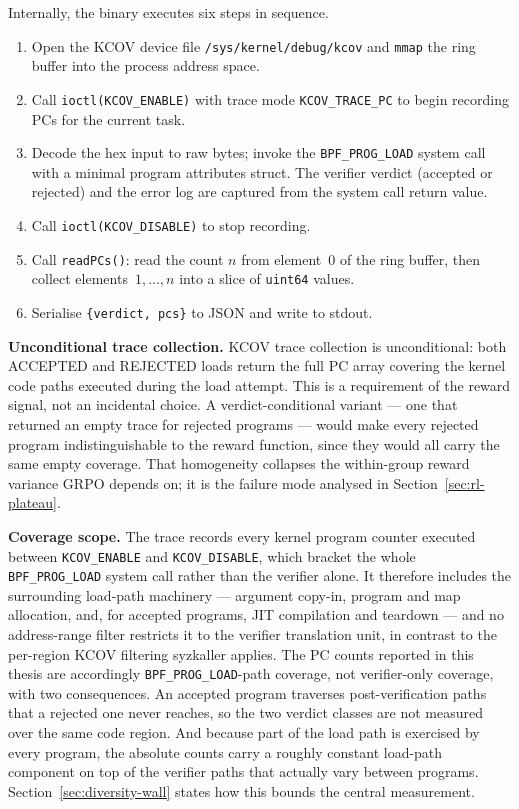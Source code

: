 Internally, the binary executes six steps in sequence.
\begin{enumerate}
  \item Open the KCOV device file \texttt{/sys/kernel/debug/kcov} and
        \texttt{mmap} the ring buffer into the process address space.
  \item Call \texttt{ioctl(KCOV\_ENABLE)} with trace mode
        \texttt{KCOV\_TRACE\_PC} to begin recording PCs for the current task.
  \item Decode the hex input to raw bytes; invoke the \texttt{BPF\_PROG\_LOAD}
        system call with a minimal program attributes struct.
        The verifier verdict (accepted or rejected) and the error log are
        captured from the system call return value.
  \item Call \texttt{ioctl(KCOV\_DISABLE)} to stop recording.
  \item Call \texttt{readPCs()}: read the count $n$ from element~0 of the
        ring buffer, then collect elements~$1, \ldots, n$ into a slice of
        \texttt{uint64} values.
  \item Serialise \texttt{\{verdict, pcs\}} to JSON and write to stdout.
\end{enumerate}

\textbf{Unconditional trace collection.}
KCOV trace collection is unconditional: both ACCEPTED and REJECTED loads return
the full PC array covering the kernel code paths executed during the load
attempt.
This is a requirement of the reward signal, not an incidental choice.
A verdict-conditional variant --- one that returned an empty trace for rejected
programs --- would make every rejected program indistinguishable to the reward
function, since they would all carry the same empty coverage.
That homogeneity collapses the within-group reward variance GRPO depends on; it
is the failure mode analysed in Section~\ref{sec:rl-plateau}.

\textbf{Coverage scope.}
The trace records every kernel program counter executed between
\texttt{KCOV\_ENABLE} and \texttt{KCOV\_DISABLE}, which bracket the whole
\texttt{BPF\_PROG\_LOAD} system call rather than the verifier alone. It therefore
includes the surrounding load-path machinery --- argument copy-in, program and map
allocation, and, for accepted programs, JIT compilation and teardown --- and no
address-range filter restricts it to the verifier translation unit, in contrast to
the per-region KCOV filtering syzkaller applies. The PC counts reported in this
thesis are accordingly \texttt{BPF\_PROG\_LOAD}-path coverage, not verifier-only
coverage, with two consequences. An accepted program traverses post-verification
paths that a rejected one never reaches, so the two verdict classes are not measured
over the same code region. And because part of the load path is exercised by every
program, the absolute counts carry a roughly constant load-path component on top of
the verifier paths that actually vary between programs.
Section~\ref{sec:diversity-wall} states how this bounds the central measurement.


